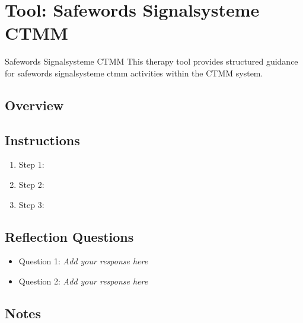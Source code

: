 
\section{Tool: Safewords Signalsysteme CTMM}
\label{sec:tool-safewords-signalsysteme-ctmm}

\begin{ctmmBlueBox}{Safewords Signalsysteme CTMM}
This therapy tool provides structured guidance for safewords signalsysteme ctmm activities within the CTMM system.
\end{ctmmBlueBox}

\subsection{Overview}

\subsection{Instructions}

\begin{enumerate}
\item Step 1: \checkbox~
\item Step 2: \checkbox~
\item Step 3: \checkbox~
\end{enumerate}

\subsection{Reflection Questions}

\begin{itemize}
\item Question 1: \textit{Add your response here}
\item Question 2: \textit{Add your response here}
\end{itemize}

\subsection{Notes}

\vspace{2cm}

